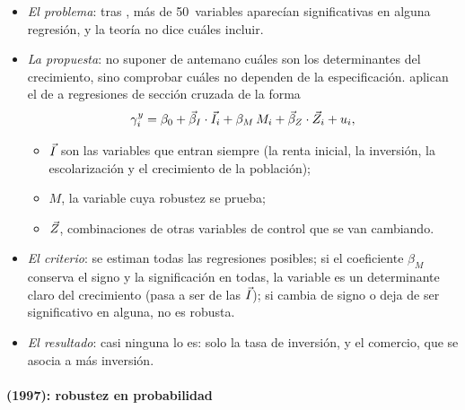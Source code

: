 \documentclass[11pt]{article}
\begin{document}
\begin{itemize}
\item \emph{El problema}: tras , más de 50~variables aparecían significativas en alguna regresión, y la teoría no dice cuáles incluir.
\item \emph{La propuesta}: no suponer de antemano cuáles son los determinantes del crecimiento, sino comprobar cuáles no dependen de la especificación. \textcite{LevineRenelt1992} aplican el  de \textcite{Leamer1983} a regresiones de sección cruzada de la forma
  \[
  \gamma^{y}_i=\beta_0+\vec{\beta}_I\cdot\vec{I}_i+\beta_M\,M_i+\vec{\beta}_Z\cdot\vec{Z}_i+u_i ,
  \]
  \begin{itemize}
  \item $\vec{I}$ son las variables que entran siempre (la renta inicial, la inversión, la escolarización y el crecimiento de la población);
  \item $M$, la variable cuya robustez se prueba;
  \item $\vec{Z}$, combinaciones de otras variables de control que se van cambiando.
  \end{itemize}
\item \emph{El criterio}: se estiman todas las regresiones posibles; si el coeficiente $\beta_M$ conserva el signo y la significación en todas, la variable es un determinante claro del crecimiento (pasa a ser de las $\vec{I}$); si cambia de signo o deja de ser significativo en alguna, no es robusta.
\item \emph{El resultado}: casi ninguna lo es: solo la tasa de inversión, y el comercio, que se asocia a más inversión.
\end{itemize}

\paragraph{ (1997): robustez en probabilidad}
\end{document}

